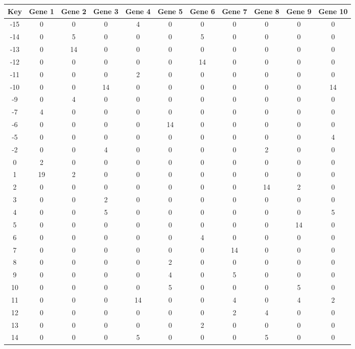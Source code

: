 \begin{tabular}{|c|c|c|c|c|c|c|c|c|c|c|}
\hline
Key & Gene 1 & Gene 2 & Gene 3 & Gene 4 & Gene 5 & Gene 6 & Gene 7 & Gene 8 & Gene 9 & Gene 10 \\
\hline
-15 & 0 & 0 & 0 & 4 & 0 & 0 & 0 & 0 & 0 & 0 \\
-14 & 0 & 5 & 0 & 0 & 0 & 5 & 0 & 0 & 0 & 0 \\
-13 & 0 & 14 & 0 & 0 & 0 & 0 & 0 & 0 & 0 & 0 \\
-12 & 0 & 0 & 0 & 0 & 0 & 14 & 0 & 0 & 0 & 0 \\
-11 & 0 & 0 & 0 & 2 & 0 & 0 & 0 & 0 & 0 & 0 \\
-10 & 0 & 0 & 14 & 0 & 0 & 0 & 0 & 0 & 0 & 14 \\
-9 & 0 & 4 & 0 & 0 & 0 & 0 & 0 & 0 & 0 & 0 \\
-7 & 4 & 0 & 0 & 0 & 0 & 0 & 0 & 0 & 0 & 0 \\
-6 & 0 & 0 & 0 & 0 & 14 & 0 & 0 & 0 & 0 & 0 \\
-5 & 0 & 0 & 0 & 0 & 0 & 0 & 0 & 0 & 0 & 4 \\
-2 & 0 & 0 & 4 & 0 & 0 & 0 & 0 & 2 & 0 & 0 \\
0 & 2 & 0 & 0 & 0 & 0 & 0 & 0 & 0 & 0 & 0 \\
1 & 19 & 2 & 0 & 0 & 0 & 0 & 0 & 0 & 0 & 0 \\
2 & 0 & 0 & 0 & 0 & 0 & 0 & 0 & 14 & 2 & 0 \\
3 & 0 & 0 & 2 & 0 & 0 & 0 & 0 & 0 & 0 & 0 \\
4 & 0 & 0 & 5 & 0 & 0 & 0 & 0 & 0 & 0 & 5 \\
5 & 0 & 0 & 0 & 0 & 0 & 0 & 0 & 0 & 14 & 0 \\
6 & 0 & 0 & 0 & 0 & 0 & 4 & 0 & 0 & 0 & 0 \\
7 & 0 & 0 & 0 & 0 & 0 & 0 & 14 & 0 & 0 & 0 \\
8 & 0 & 0 & 0 & 0 & 2 & 0 & 0 & 0 & 0 & 0 \\
9 & 0 & 0 & 0 & 0 & 4 & 0 & 5 & 0 & 0 & 0 \\
10 & 0 & 0 & 0 & 0 & 5 & 0 & 0 & 0 & 5 & 0 \\
11 & 0 & 0 & 0 & 14 & 0 & 0 & 4 & 0 & 4 & 2 \\
12 & 0 & 0 & 0 & 0 & 0 & 0 & 2 & 4 & 0 & 0 \\
13 & 0 & 0 & 0 & 0 & 0 & 2 & 0 & 0 & 0 & 0 \\
14 & 0 & 0 & 0 & 5 & 0 & 0 & 0 & 5 & 0 & 0 \\
\hline
\end{tabular}
